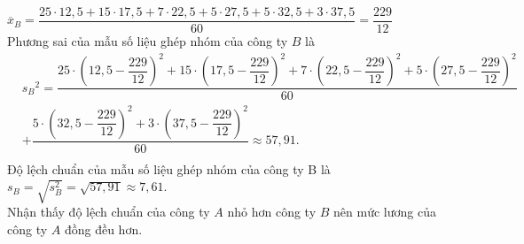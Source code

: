 \begin{ex}
{\begin{itemchoice}
		$\overline{x}_B=\dfrac{25\cdot  12{,}5+15\cdot 17{,}5+7\cdot 22{,}5+5\cdot 27{,}5+5\cdot 32{,}5+3\cdot 37{,}5}{60}=\dfrac{229}{12}$\\
		Phương sai của mẫu số  liệu ghép nhóm của công ty $B$ là\\
		$\begin{aligned}
		&{s_B}^2=\dfrac{25\cdot \left(12{,}5-\dfrac{229}{12}\right)^2+15\cdot \left(17{,}5-\dfrac{229}{12}\right)^2+7\cdot \left(22{,}5-\dfrac{229}{12}\right)^2+5\cdot  \left(27{,}5-\dfrac{229}{12}\right)^2}{60}\\
		&+\dfrac{5\cdot \left(32{,}5-\dfrac{229}{12}\right)^2+3\cdot \left(37{,}5-\dfrac{229}{12}\right)^2}{60}\approx  57{,}91.\\
	\end{aligned}$
	\itemch  Độ lệch chuẩn của mẫu số liệu ghép nhóm của công ty B là $s_B=\sqrt{s_B^2}=\sqrt{57{,}91}\approx 7{,}61$.\\
	Nhận  thấy độ lệch chuẩn của công ty $A$ nhỏ hơn công ty $B$ nên mức lương của công ty $A$ đồng đều hơn.
	\end{itemchoice}
 }
\end{ex}

